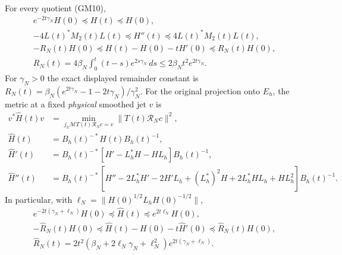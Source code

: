 \begin{hzoctheorem}
For every quotient (GM10),
\begin{equation}\tag{GM13}
 \begin{gathered}
 e^{-2t\gamma_N}H(0)\preceq H(t)\preceq H(0),\\
 -4L(t)^*M_2(t)L(t)\preceq H''(t)
                     \preceq4L(t)^*M_2(t)L(t),\\
 -R_N(t)H(0)\preceq H(t)-H(0)-tH'(0)\preceq R_N(t)H(0),\\
 R_N(t)=4\beta_N\int_0^t(t-s)e^{2s\gamma_N}\,ds
 \leq2\beta_Nt^2e^{2t\gamma_N}.
 \end{gathered}
\end{equation}
For $\gamma_N>0$ the exact displayed remainder constant is
$R_N(t)=\beta_N(e^{2t\gamma_N}-1-2t\gamma_N)/\gamma_N^2$.
For the original projection onto $E_h$, the metric at a fixed
\emph{physical} smoothed jet $v$ is
\begin{equation}\tag{GM14}
 \begin{split}
 v^*\widehat H(t)v
 &=\min_{j_h\mathcal M T(t)\mathcal R_Nc=v}
                  \|T(t)\mathcal R_Nc\|^2,\\
 \widehat H(t)&=B_h(t)^{-*}H(t)B_h(t)^{-1},\\
 \widehat H'(t)&=B_h(t)^{-*}
       [H'-L_h^*H-HL_h]B_h(t)^{-1},\\
 \widehat H''(t)&=B_h(t)^{-*}
       [H''-2L_h^*H'-2H'L_h+(L_h^*)^2H
                    +2L_h^*HL_h+HL_h^2]B_h(t)^{-1}.
 \end{split}
\end{equation}
In particular, with $\ell_N=\|H(0)^{1/2}L_hH(0)^{-1/2}\|$,
\begin{equation}\tag{GM15}
 \begin{gathered}
 e^{-2t(\gamma_N+\ell_N)}H(0)
       \preceq\widehat H(t)\preceq e^{2t\ell_N}H(0),\\
 -\widehat R_N(t)H(0)
 \preceq\widehat H(t)-H(0)-t\widehat H'(0)
 \preceq\widehat R_N(t)H(0),\\
 \widehat R_N(t)=2t^2
       (\beta_N+2\ell_N\gamma_N+\ell_N^2)
                     e^{2t(\gamma_N+\ell_N)}.
 \end{gathered}
\end{equation}
\end{hzoctheorem}

